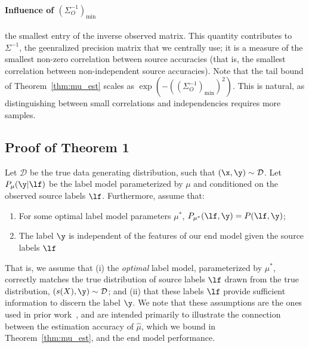 \documentclass[letterpaper]{article}
\begin{document}
\begin{appendix}
\paragraph*{Influence of $(\Sigma_O^{-1})_{\min}$} the smallest entry of the inverse observed matrix. This quantity contributes to $\Sigma^{-1}$, the geenralized precision matrix that we centrally use; it is a measure of the smallest non-zero correlation between source accuracies (that is, the smallest correlation between non-independent source accuracies). Note that the tail bound of Theorem~\ref{thm:mu_est} scales as $\exp(-((\Sigma_O^{-1})_{\min})^2)$. This is natural, as distinguishing between small correlations and independencies requires more samples. 


\subsection{Proof of Theorem 1}
\label{appendix:theorem-1}

Let $\mathcal{D}$ be the true data generating distribution, such that $(\x, \y) \sim \mathcal{D}$.
Let $P_\mu(\y|\lf)$ be the label model parameterized by $\mu$ and conditioned on the observed source labels $\lf$.
Furthermore, assume that:
\begin{enumerate}
	\item For some optimal label model parameters $\mu^*$, $P_{\mu^*}(\lf, \y) = P(\lf, \y)$;
	\item The label $\y$ is independent of the features of our end model given the source labels $\lf$
\end{enumerate}
That is, we assume that (i) the \textit{optimal} label model, parameterized by $\mu^*$, correctly matches the true distribution of source labels $\lf$ drawn from the true distribution, $(s(X), \y) \sim \mathcal{D}$; and (ii) that these labels $\lf$ provide sufficient information to discern the label $\y$.
We note that these assumptions are the ones used in prior work~\citep{ratner2016data}, and are intended primarily to illustrate the connection between the estimation accuracy of $\hat{\mu}$, which we bound in Theorem~\ref{thm:mu_est}, and the end model performance.


\end{appendix}
\end{document}
